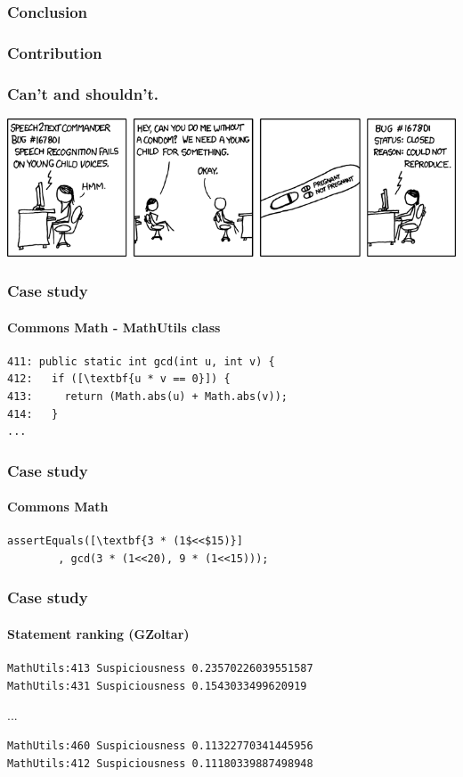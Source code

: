 \documentclass{beamer}
\begin{document}
  \frame
  {
    \frametitle{Conclusion}
    
  }

  \frame
  {
    \frametitle{Contribution}
    
  }
  
 \frame
  {
    \frametitle{Can't and shouldn't.}
\includegraphics[width=.8\paperwidth]{cnr}

}



 \begin{frame}[fragile]
    \frametitle{Case study}
      \framesubtitle{Commons Math - MathUtils class}
\begin{lstlisting}[escapeinside=\[\]]
411: public static int gcd(int u, int v) {
412:   if ([\textbf{u * v == 0}]) {
413:     return (Math.abs(u) + Math.abs(v));
414:   }
...
\end{lstlisting}
\end{frame}

 \begin{frame}[fragile]
    \frametitle{Case study}
      \framesubtitle{Commons Math}
        \begin{lstlisting}[escapeinside=\[\]]
assertEquals([\textbf{3 * (1$<<$15)}]
        , gcd(3 * (1<<20), 9 * (1<<15)));
	\end{lstlisting}
\end{frame}

 \begin{frame}[fragile]
    \frametitle{Case study}
      \framesubtitle{Statement ranking (GZoltar)}
\begin{verbatim}
MathUtils:413 Suspiciousness 0.23570226039551587
MathUtils:431 Suspiciousness 0.1543033499620919
\end{verbatim}
...
\begin{verbatim}
MathUtils:460 Suspiciousness 0.11322770341445956
MathUtils:412 Suspiciousness 0.11180339887498948
\end{verbatim}
\end{frame}
\end{document}
